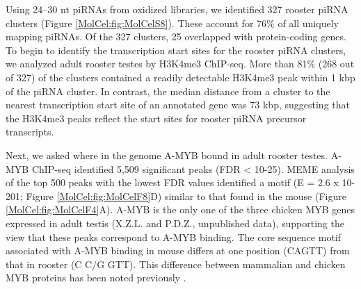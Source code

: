     Using 24–30 nt piRNAs from oxidized libraries, we identified 327 rooster piRNA clusters (Figure \ref{MolCel:fig:MolCelS8}). These account for 76\% of all uniquely mapping piRNAs. Of the 327 clusters, 25 overlapped with protein-coding genes. To begin to identify the transcription start sites for the rooster piRNA clusters, we analyzed adult rooster testes by H3K4me3 ChIP-seq. More than 81\% (268 out of 327) of the clusters contained a readily detectable H3K4me3 peak within 1 kbp of the piRNA cluster. In contrast, the median distance from a cluster to the nearest transcription start site of an annotated gene was 73 kbp, suggesting that the H3K4me3 peaks reflect the start sites for rooster piRNA precursor transcripts.

    Next, we asked where in the genome A-MYB bound in adult rooster testes. A-MYB ChIP-seq identified 5,509 significant peaks (FDR < 10-25). MEME analysis of the top 500 peaks with the lowest FDR values identified a motif (E = 2.6 x 10-201; Figure \ref{MolCel:fig:MolCelF8}D) similar to that found in the mouse (Figure \ref{MolCel:fig:MolCelF4}A). A-MYB is the only one of the three chicken MYB genes expressed in adult testis (X.Z.L. and P.D.Z., unpublished data), supporting the view that these peaks correspond to A-MYB binding. The core sequence motif associated with A-MYB binding in mouse differs at one position (CAGTT) from that in rooster (C C/G GTT). This difference between mammalian and chicken MYB proteins has been noted previously \citep{Weston1992, Deng1996}.


